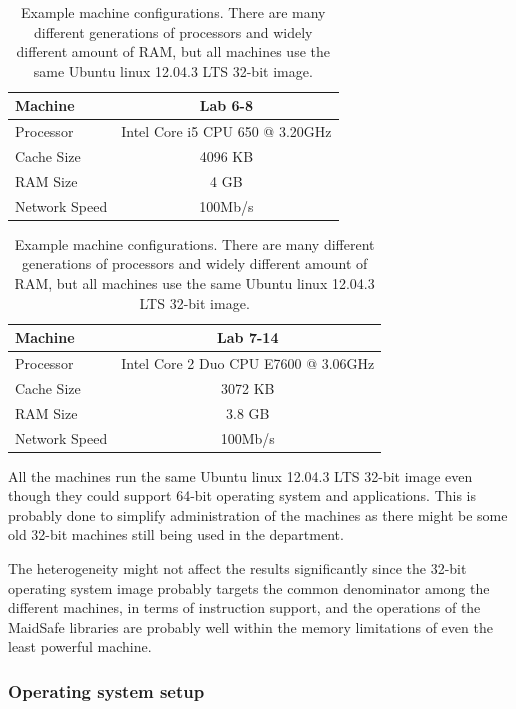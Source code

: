\begin{table}[htdp]
\begin{center}
\begin{tabular}{|l|c|}
\hline
Machine & Lab 6-8 \\
\hline
Processor &  Intel Core i5 CPU         650  @ 3.20GHz\\
\hline
Cache Size & 4096 KB\\
\hline
RAM Size & 4 GB\\
\hline
Network Speed & 100Mb/s\\
\hline
\end{tabular}
\end{center}

\begin{center}
\begin{tabular}{|l|c|}
\hline
Machine & Lab 7-14 \\
\hline
Processor &  Intel Core 2 Duo CPU     E7600  @ 3.06GHz\\
\hline
Cache Size & 3072 KB\\
\hline
RAM Size & 3.8 GB\\
\hline
Network Speed & 100Mb/s\\
\hline
\end{tabular}
\end{center}

\caption[Example machine configurations.]{Example machine configurations. There are many different generations of processors and widely different amount of RAM, but all machines use the same Ubuntu linux 12.04.3 LTS 32-bit image.}
\label{tb:MachineConfigurations}
\end{table}%

 
 All the machines run the same Ubuntu linux 12.04.3 LTS 32-bit image even though they could support 64-bit operating system and applications. This is probably done to simplify administration of the machines as there might be some old 32-bit machines still being used in the department.

The heterogeneity might not affect the results significantly since the 32-bit operating system image probably targets the common denominator among the different machines, in terms of instruction support, and the operations of the MaidSafe libraries are probably well within the memory limitations of even the least powerful machine.

\subsubsection{Operating system setup}

